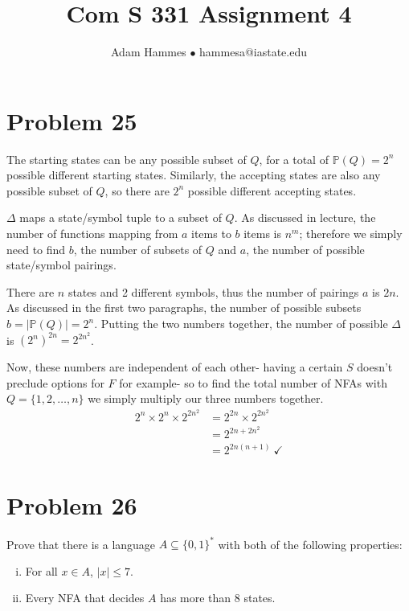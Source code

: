 \documentclass[11pt]{article}
\begin{document}
\title{Com S 331 Assignment 4}
\author{Adam Hammes $\bullet$ hammesa@iastate.edu }
\maketitle

\section*{Problem 25}

The starting states can be any possible subset of $Q$, for a total of $\mathbb{P}(Q) = 2^n$ possible different starting states. Similarly, the accepting states are also any possible subset of $Q$, so there are $2^n$ possible different accepting states.

$\Delta$ maps a state/symbol tuple to a subset of $Q$. As discussed in lecture, the number of functions mapping from $a$ items to $b$ items is $n^m$; therefore we simply need to find $b$, the number of subsets of $Q$ and $a$, the number of possible state/symbol pairings.

There are $n$ states and 2 different symbols, thus the number of pairings $a$ is $2n$. As discussed in the first two paragraphs, the number of possible subsets $b= |\mathbb{P}(Q)| = 2^n$. Putting the two numbers together, the number of possible $\Delta$ is $(2^n)^{2n} = 2^{2n^2}$.

Now, these numbers are independent of each other- having a certain $S$ doesn't preclude options for $F$ for example- so to find the total number of NFAs with $Q = \{1, 2, \dots, n \}$ we simply multiply our three numbers together.
	\begin{align*}
		2^n \times 2^n \times 2^{2n^2} &= 2^{2n} \times 2^{2n^2} \\
		&= 2^{2n + 2n^2} \\
		&= 2^{2n(n+1)} \ \checkmark
	\end{align*}
	
\section*{Problem 26}

Prove that there is a language $A \subseteq \{0,1\}^*$ with both of the following properties:
	\begin{enumerate}[(i)]
		\item For all $x \in A$, $|x| \leq 7$.
		\item Every NFA that decides $A$ has more than 8 states.
	\end{enumerate}
	
\end{document}
